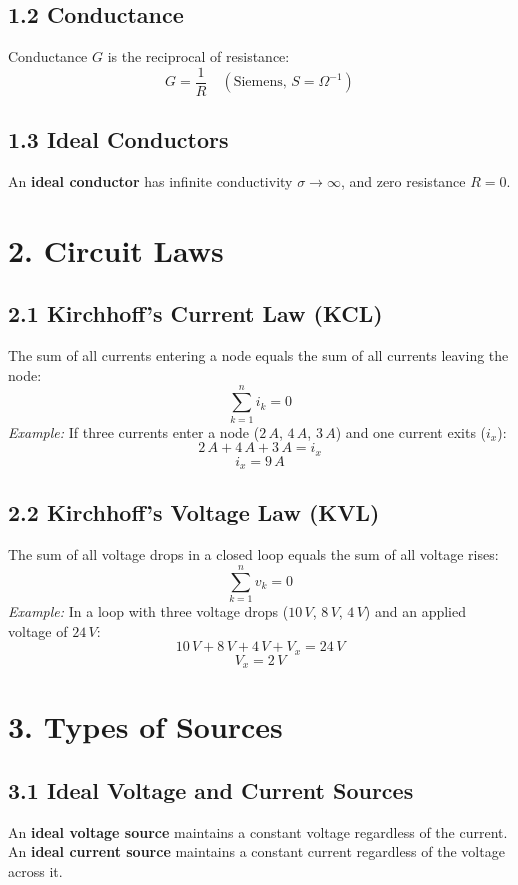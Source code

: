 \documentclass[10pt]{article} %
\begin{document}
\begin{multicols}{2}
\subsection*{1.2 Conductance}
Conductance \( G \) is the reciprocal of resistance:
\[
\displaystyle G = \frac{1}{R} \quad (\text{Siemens, } S = \Omega^{-1})
\]

\subsection*{1.3 Ideal Conductors}
An \textbf{ideal conductor} has infinite conductivity \( \sigma \to \infty \), and zero resistance \( R = 0 \).

\section*{2. Circuit Laws}

\subsection*{2.1 Kirchhoff’s Current Law (KCL)}
The sum of all currents entering a node equals the sum of all currents leaving the node:
\[
\displaystyle \sum_{k=1}^{n} i_k = 0
\]
\textit{Example:} If three currents enter a node (\( 2 \, A \), \( 4 \, A \), \( 3 \, A \)) and one current exits (\( i_x \)):
\[
\displaystyle 2 \, A + 4 \, A + 3 \, A = i_x
\]
\[
i_x = 9 \, A
\]


\subsection*{2.2 Kirchhoff’s Voltage Law (KVL)}
The sum of all voltage drops in a closed loop equals the sum of all voltage rises:
\[
\displaystyle \sum_{k=1}^{n} v_k = 0
\]
\textit{Example:} In a loop with three voltage drops (\( 10 \, V \), \( 8 \, V \), \( 4 \, V \)) and an applied voltage of \( 24 \, V \):
\[
\displaystyle 10 \, V + 8 \, V + 4 \, V + V_x = 24 \, V
\]
\[
V_x = 2 \, V
\]


\section*{3. Types of Sources}

\subsection*{3.1 Ideal Voltage and Current Sources}
An \textbf{ideal voltage source} maintains a constant voltage regardless of the current. An \textbf{ideal current source} maintains a constant current regardless of the voltage across it.


\end{multicols}
\end{document}
